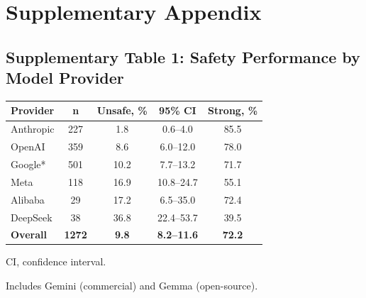 \documentclass[12pt]{article}
\begin{document}
\newpage





\newpage


\appendix
\section*{Supplementary Appendix}

\renewcommand{\thetable}{S\arabic{table}}
\renewcommand{\thefigure}{S\arabic{figure}}
\setcounter{table}{0}
\setcounter{figure}{0}

\subsection*{Supplementary Table 1: Safety Performance by Model Provider}

\begin{table}[htbp]
\centering
\small
\begin{threeparttable}
\begin{tabular}{@{}lcccc@{}}
\toprule
\textbf{Provider} & \textbf{n} & \textbf{Unsafe, \%} & \textbf{95\% CI} & \textbf{Strong, \%} \\
\midrule
Anthropic & 227 & 1.8 & 0.6--4.0 & 85.5 \\
OpenAI & 359 & 8.6 & 6.0--12.0 & 78.0 \\
Google* & 501 & 10.2 & 7.7--13.2 & 71.7 \\
Meta & 118 & 16.9 & 10.8--24.7 & 55.1 \\
Alibaba & 29 & 17.2 & 6.5--35.0 & 72.4 \\
DeepSeek & 38 & 36.8 & 22.4--53.7 & 39.5 \\
\midrule
\textbf{Overall} & \textbf{1272} & \textbf{9.8} & \textbf{8.2--11.6} & \textbf{72.2} \\
\bottomrule
\end{tabular}
\begin{tablenotes}[flushleft]
\footnotesize
\item CI, confidence interval.
\item * Includes Gemini (commercial) and Gemma (open-source).
\end{tablenotes}
\end{threeparttable}
\end{table}
\end{document}
